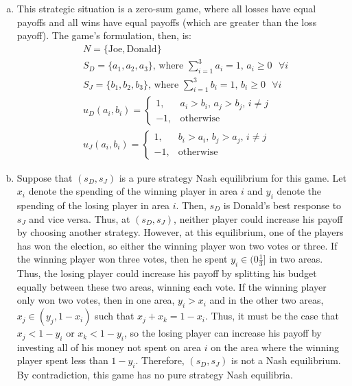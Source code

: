 \documentclass{article}
\begin{document}
\begin{enumerate}[(a)]
	\item This strategic situation is a zero-sum game, where all losses have equal payoffs and all wins have equal payoffs (which are greater than the loss payoff). The game's formulation, then, is:
		\begin{align*}
			&N = \{\text{Joe},\text{Donald}\}	\\
			&S_D = \{a_1,a_2,a_3\}\text{, where }\sum_{i=1}^3a_i=1\text{, }a_i\geq0\text{ }\forall i	\\
			&S_J = \{b_1,b_2,b_3\}\text{, where }\sum_{i=1}^3b_i=1\text{, }b_i\geq0\text{ }\forall i	\\
			&u_D(a_i,b_i) = \begin{cases} 1, &a_i > b_i\text{, }a_j > b_j\text{, }i\neq j \\ -1, &\text{otherwise} \end{cases} 	\\
			&u_J(a_i,b_i) = \begin{cases} 1, &b_i > a_i\text{, }b_j > a_j\text{, }i\neq j \\ -1, &\text{otherwise} \end{cases} 
		\end{align*}
	
	\item Suppose that $(s_D,s_J)$ is a pure strategy Nash equilibrium for this game. Let $x_i$ denote the spending of the winning player in area $i$ and $y_i$ denote the spending of the losing player in area $i$. Then, $s_D$ is Donald's best response to $s_J$ and vice versa. Thus, at ${(s_D,s_J)}$, neither player could increase his payoff by choosing another strategy. However, at this equilibrium, one of the players has won the election, so either the winning player won two votes or three. If the winning player won three votes, then he spent ${y_i\in(0\frac{1}{3}]}$ in two areas. Thus, the losing player could increase his payoff by splitting his budget equally between these two areas, winning each vote. If the winning player only won two votes, then in one area, ${y_i > x_i}$ and in the other two areas, ${x_j\in(y_j,1-x_i)}$ such that ${x_j+x_k = 1-x_i}$. Thus, it must be the case that ${x_j<1-y_i}$ or ${x_k<1-y_i}$, so the losing player can increase his payoff by investing all of his money not spent on area $i$ on the area where the winning player spent less than ${1-y_i}$. Therefore, $(s_D,s_J)$ is not a Nash equilibrium. By contradiction, this game has no pure strategy Nash equilibria.
\end{enumerate}
\end{document}
